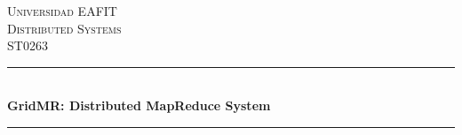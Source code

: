 %
%
%


\newcommand{\projectTitle}{GridMR: Distributed MapReduce System}
\newcommand{\classCode}{ST0263}
\newcommand{\className}{Distributed Systems}


\begin{titlepage} %
	\newcommand{\HRule}{\rule{\linewidth}{0.5mm}} %

	\center %


	\textsc{\LARGE Universidad EAFIT}\\[1.5cm] %


	\textsc{\Large \className}\\[0.5cm] %
	\textsc{\large \classCode}\\[0.5cm] %


	\HRule\\[0.4cm]
	{\huge\bfseries \projectTitle}\\[0.4cm] %

	\HRule\\[1.5cm]



\end{titlepage}

